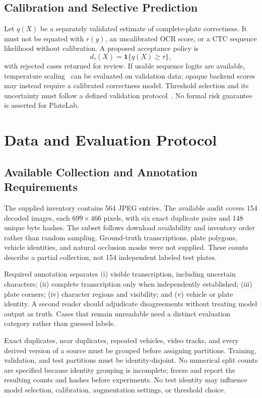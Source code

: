 \documentclass[journal]{IEEEtran}
\newcommand{\ind}{\mathbf{1}}
\begin{document}
\subsection{Calibration and Selective Prediction}
Let $q(X)$ be a separately validated estimate of complete-plate correctness. It must not be equated with $r(y)$, an uncalibrated OCR score, or a CTC sequence likelihood without calibration. A proposed acceptance policy is
\begin{equation}\label{eq:accept}
 d_\tau(X)=\ind\{q(X)\geq\tau\},
\end{equation}
with rejected cases returned for review. If usable sequence logits are available, temperature scaling~\cite{guo2017} can be evaluated on validation data; opaque backend scores may instead require a calibrated correctness model. Threshold selection and its uncertainty must follow a defined validation protocol~\cite{geifman2017}. No formal risk guarantee is asserted for PlateLab.

\section{Data and Evaluation Protocol}\label{sec:protocol}
\subsection{Available Collection and Annotation Requirements}
The supplied inventory contains 564 JPEG entries. The available audit covers 154 decoded images, each $699\times466$ pixels, with six exact duplicate pairs and 148 unique byte hashes. The subset follows download availability and inventory order rather than random sampling. Ground-truth transcriptions, plate polygons, vehicle identities, and natural occlusion masks were not supplied. These counts describe a partial collection, not 154 independent labeled test plates.

Required annotation separates (i) visible transcription, including uncertain characters; (ii) complete transcription only when independently established; (iii) plate corners; (iv) character regions and visibility; and (v) vehicle or plate identity. A second reader should adjudicate disagreements without treating model output as truth. Cases that remain unreadable need a distinct evaluation category rather than guessed labels.

Exact duplicates, near duplicates, repeated vehicles, video tracks, and every derived version of a source must be grouped before assigning partitions. Training, validation, and test partitions must be identity-disjoint. No numerical split counts are specified because identity grouping is incomplete; freeze and report the resulting counts and hashes before experiments. No test identity may influence model selection, calibration, augmentation settings, or threshold choice.
\end{document}
